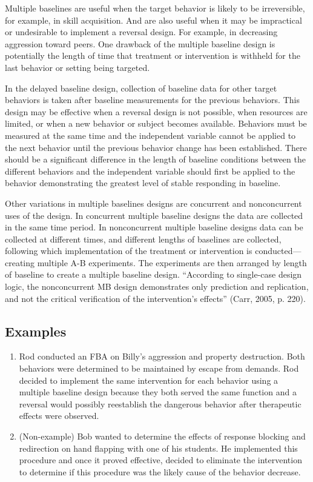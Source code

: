 Multiple baselines are useful when the target behavior is likely to be irreversible, for example, in skill acquisition. And are also useful when it may be impractical or undesirable to implement a reversal design. For example, in decreasing aggression toward peers. One drawback of the multiple baseline design is potentially the length of time that treatment or intervention is withheld for the last behavior or setting being targeted. 

In the delayed baseline design, collection of baseline data for other target behaviors is taken after baseline measurements for the previous behaviors. This design may be effective when a reversal design is not possible, when resources are limited, or when a new behavior or subject becomes available. Behaviors must be measured at the same time and the independent variable cannot be applied to the next behavior until the previous behavior change has been established. There should be a significant difference in the length of baseline conditions between the different behaviors and the independent variable should first be applied to the behavior demonstrating the greatest level of stable responding in baseline.

Other variations in multiple baselines designs are concurrent and nonconcurrent uses of the design. In concurrent multiple baseline designs the data are collected in the same time period. In nonconcurrent multiple baseline designs data can be collected at different times, and different lengths of baselines are collected, following which implementation of the treatment or intervention is conducted—creating multiple A-B experiments. The experiments are then arranged by length of baseline to create a multiple baseline design.  ``According to single-case design logic, the nonconcurrent MB design demonstrates only prediction and replication, and not the critical verification of the intervention's effects'' (Carr, 2005, p. 220).

\subsection{Examples}
\begin{enumerate}
\item Rod conducted an FBA on Billy's aggression and property destruction. Both behaviors were determined to be maintained by escape from demands. Rod decided to implement the same intervention for each behavior using a multiple baseline design because they both served the same function and a reversal would possibly reestablish the dangerous behavior after therapeutic effects were observed. 
\item (Non-example) Bob wanted to determine the effects of response blocking and redirection on hand flapping with one of his students. He implemented this procedure and once it proved effective, decided to eliminate the intervention to determine if this procedure was the likely cause of the behavior decrease. 
\end{enumerate}
%
